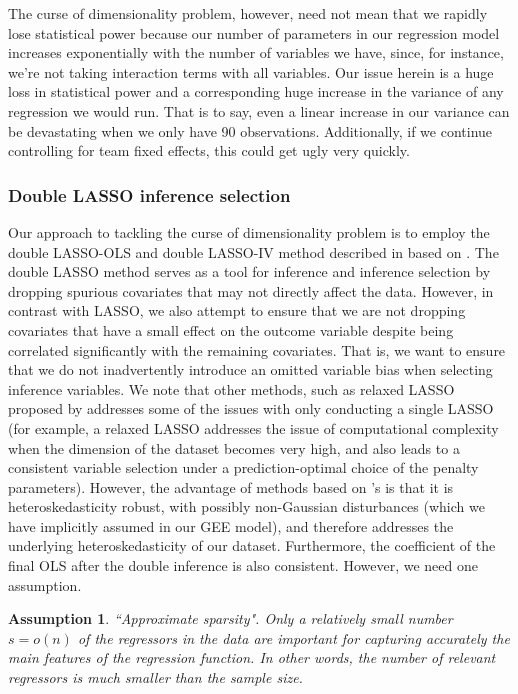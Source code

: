 \documentclass[12pt]{article}
\newtheorem{assumption}{Assumption}
\begin{document}
	The curse of dimensionality problem, however, need not mean that we rapidly lose statistical power because our number of parameters in our regression model increases exponentially with the number of variables we have, since, for instance, we're not taking interaction terms with all variables. Our issue herein is a huge loss in statistical power and a corresponding huge increase in the variance of any regression we would run. That is to say, even a linear increase in our variance can be devastating when we only have 90 observations. Additionally, if we continue controlling for team fixed effects, this could get ugly very quickly.
	
	\subsubsection{Double LASSO inference selection}
	
	Our approach to tackling the curse of dimensionality problem is to employ the double LASSO-OLS and double LASSO-IV method described in \cite{urminsky_using_2016} based on \cite{belloni_high-dimensional_2014}. The double LASSO method serves as a tool for inference and inference selection by dropping spurious covariates that may not directly affect the data. However, in contrast with LASSO, we also attempt to ensure that we are not dropping covariates that have a small effect on the outcome variable despite being correlated significantly with the remaining covariates. That is, we want to ensure that we do not inadvertently introduce an omitted variable bias when selecting inference variables. We note that other methods, such as relaxed LASSO proposed by \cite{meinshausen_relaxed_2007} addresses some of the issues with only conducting a single LASSO (for example, a relaxed LASSO addresses the issue of computational complexity when the dimension of the dataset becomes very high, and also leads to a consistent variable selection under a prediction-optimal choice of the penalty parameters). However, the advantage of methods based on \cite{belloni_high-dimensional_2014}'s is that it is heteroskedasticity robust, with possibly non-Gaussian disturbances (which we have implicitly assumed in our GEE model), and therefore addresses the underlying heteroskedasticity of our dataset. Furthermore, the coefficient of the final OLS after the double inference is also consistent. However, we need one assumption.
	
	\begin{assumption}{``Approximate sparsity".}
		Only a relatively small number $s = o\left(n\right)$ of the regressors in the data are important for capturing accurately the main features of the regression function. In other words, the number of relevant regressors is much smaller than the sample size.
	\end{assumption}
	
\end{document}

